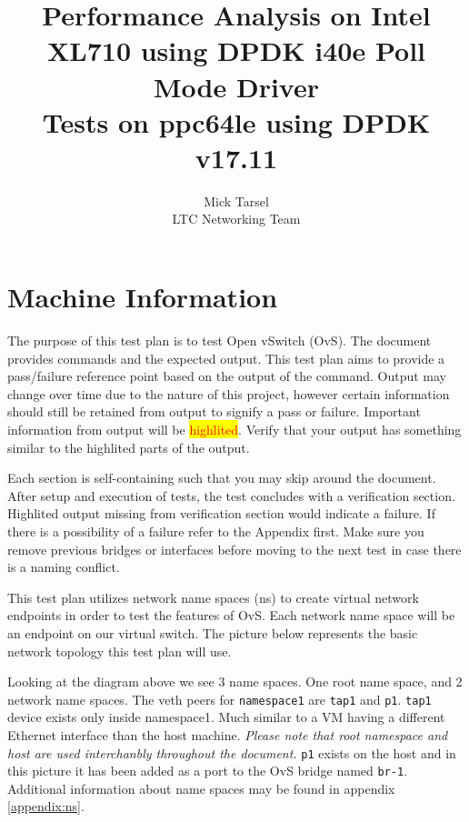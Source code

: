 \documentclass[letter]{article}
\title{Performance Analysis on Intel XL710 using DPDK i40e Poll Mode Driver \\ Tests on ppc64le using DPDK v17.11}
\author{Mick Tarsel \\  LTC Networking Team \\}
\begin{document}

\maketitle

\newpage
\tableofcontents
\newpage

\section{Machine Information}

The purpose of this test plan is to test Open vSwitch (OvS). 
The document provides commands and the expected output.
This test plan aims to provide a pass/failure reference point based on the output of the command.
Output may change over time due to the nature of this project, however certain information should still be retained from output to signify a pass or failure.
Important information from output will be \setlength{\fboxsep}{0pt}\colorbox{yellow}{{\textcolor{red}{highlited}}}. 
Verify that your output has something similar to the highlited parts of the output.

Each section is self-containing such that you may skip around the document.
After setup and execution of tests, the test concludes with a verification section. 
Highlited output missing from verification section would indicate a failure.
If there is a possibility of a failure refer to the Appendix first.
Make sure you remove previous bridges or interfaces before moving to the next test in case there is a naming conflict.

This test plan utilizes network name spaces (ns) to create virtual network endpoints in order to test the features of OvS. 
Each network name space will be an endpoint on our virtual switch. 
The picture below represents the basic network topology this test plan will use. 

Looking at the diagram above we see 3 name spaces. One root name space, and 2 network name spaces. The veth peers for \texttt{namespace1} are \texttt{tap1} and \texttt{p1}. \texttt{tap1} device exists only inside namespace1. Much similar to a VM having a different Ethernet interface than the host machine. \textit{Please note that root namespace and host are used interchanbly throughout the document.} \texttt{p1} exists on the host and in this picture it has been added as a port to the OvS bridge named \texttt{br-1}. Additional information about name spaces may be found in appendix \ref{appendix:ns}.
\end{document}
